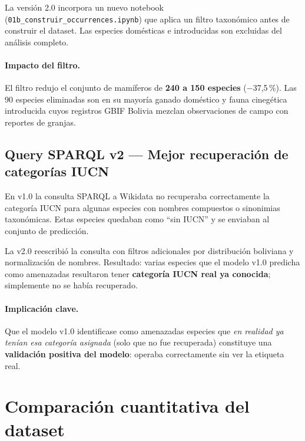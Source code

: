 \documentclass[12pt,a4paper]{article}
\begin{document}
La versión 2.0 incorpora un nuevo notebook (\texttt{01b\_construir\_occurrences.ipynb})
que aplica un filtro taxonómico antes de construir el dataset.
Las especies domésticas e introducidas son excluidas del análisis completo.

\paragraph{Impacto del filtro.}
El filtro redujo el conjunto de mamíferos de \textbf{240 a 150 especies} ($-$37,5\,\%).
Las 90 especies eliminadas son en su mayoría ganado doméstico y fauna cinegética introducida
cuyos registros GBIF Bolivia mezclan observaciones de campo con reportes de granjas.

\subsection{Query SPARQL v2 --- Mejor recuperación de categorías IUCN}

En v1.0 la consulta SPARQL a Wikidata no recuperaba correctamente la categoría IUCN para
algunas especies con nombres compuestos o sinonimias taxonómicas.
Estas especies quedaban como ``sin IUCN'' y se enviaban al conjunto de predicción.

La v2.0 reescribió la consulta con filtros adicionales por distribución boliviana y
normalización de nombres.
Resultado: varias especies que el modelo v1.0 predicha como amenazadas resultaron tener
\textbf{categoría IUCN real ya conocida}; simplemente no se había recuperado.

\paragraph{Implicación clave.}
Que el modelo v1.0 identificase como amenazadas especies que \textit{en realidad ya tenían
esa categoría asignada} (solo que no fue recuperada) constituye una \textbf{validación positiva
del modelo}: operaba correctamente sin ver la etiqueta real.

\section{Comparación cuantitativa del dataset}
\end{document}
